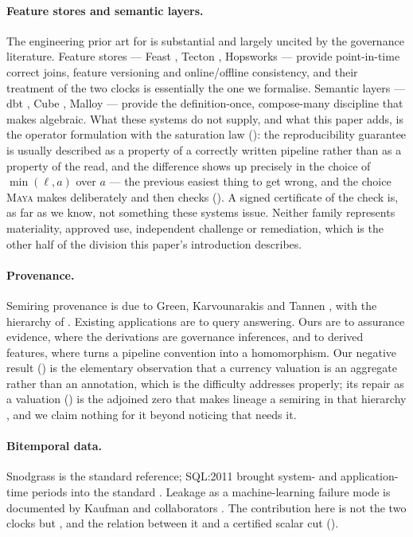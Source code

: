 \documentclass[11pt,a4paper]{article}
\renewcommand{\_}{\oldunderscore\allowbreak}
\theoremstyle{plain}
\theoremstyle{definition}
\theoremstyle{definition}
\theoremstyle{remark}
\begin{document}
\paragraph{Feature stores and semantic layers.} The engineering prior art for  is substantial
and largely uncited by the governance literature. Feature stores --- Feast \cite{feast}, Tecton
\cite{tecton}, Hopsworks \cite{hopsworks} --- provide point-in-time correct joins, feature versioning and
online/offline consistency, and their treatment of the two clocks is essentially the one we formalise.
Semantic layers --- dbt \cite{dbt}, Cube \cite{cube}, Malloy \cite{malloy} --- provide the definition-once,
compose-many discipline that  makes algebraic. What these systems do not supply, and what
this paper adds, is the operator formulation with the saturation law (): the reproducibility
guarantee is usually described as a property of a correctly written pipeline rather than as a property of the
read, and the difference shows up precisely in the choice of $\min(\ell,a)$ over $a$ --- the previous
easiest thing to get wrong, and the choice \textsc{Maya} makes deliberately and then checks
(). A signed certificate of the check is, as far as we know, not something these systems
issue. Neither family represents materiality, approved use, independent challenge or
remediation, which is the other half of the division this paper's introduction describes.

\paragraph{Provenance.} Semiring provenance is due to Green, Karvounarakis and Tannen
\cite{green2007,greentannen2017}, with the hierarchy of \cite{buneman2001,cheney2009}. Existing applications
are to query answering. Ours are to assurance evidence, where the derivations are governance inferences, and
to derived features, where  turns a pipeline convention into a homomorphism. Our negative
result () is the elementary observation that a currency valuation is an aggregate rather
than an annotation, which is the difficulty \cite{amsterdamer2011} addresses properly; its repair as a
valuation () is the adjoined zero that makes lineage a semiring in that hierarchy
\cite{greentannen2017}, and we claim nothing for it beyond noticing that  needs it.

\paragraph{Bitemporal data.} Snodgrass \cite{snodgrass2000} is the standard reference; SQL:2011 brought
system- and application-time periods into the standard \cite{kulkarni2012}. Leakage as a machine-learning
failure mode is documented by Kaufman and collaborators \cite{kaufman2012}. The contribution here is not the
two clocks but , and the relation between it and a certified scalar cut
().
\end{document}
